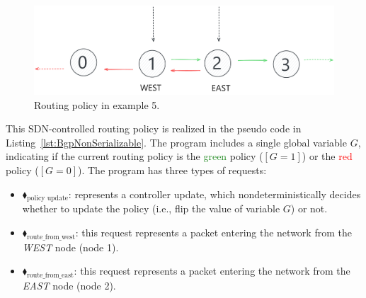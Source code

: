 


\begin{figure}[H]
	\centering
	\includegraphics[width=0.7\linewidth]{plots/east_west_routing.pdf}
	\caption{Routing policy in example 5.}
	\label{fig:BgpRoutingPolicies}
\end{figure}

This SDN-controlled routing policy is realized in the pseudo code in Listing~\ref{lst:BgpNonSerializable}.
%
The program includes a single global variable $G$, indicating if the current routing policy is the  \textcolor{ForestGreen}{green} policy ($[G=1]$) or the \textcolor{red}{red} policy ($[G=0]$).
%
The program has three types of requests:
\begin{itemize}
	
	\item
	{\color{ForestGreen}$\blacklozenge_\text{policy update}$}:
 represents a controller  update, which nondeterministically decides whether to update the policy (i.e., flip the value of  variable $G$) or not.
	
		\item
	{\color{ForestGreen}$\blacklozenge_\text{route\_from\_west}$}:
	 this request represents a packet entering the network from the \textit{WEST} node (node 1).
	
		\item
{\color{ForestGreen}$\blacklozenge_\text{route\_from\_east}$}: this request represents a packet entering the network from the \textit{EAST} node (node 2).
	
\end{itemize}


